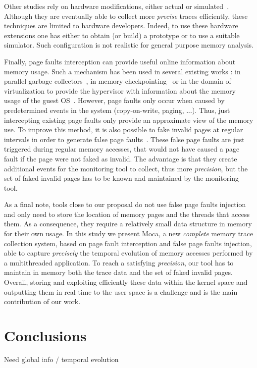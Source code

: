 Other studies rely on hardware modifications, either actual or
simulated~\cite{Bao08HMTT,Martonosi92MemSpy}.  Although they are eventually
able to collect more \emph{precise} traces efficiently, these techniques are limited
to hardware developers. Indeed, to use these hardware extensions one has
either to obtain (or build) a prototype or to use a suitable simulator. Such
configuration is not realistic for general purpose memory analysis.

Finally, page faults interception can provide useful online information about
memory usage. Such a mechanism has been used in several existing works : in
parallel garbage collectors~\cite{Boehm91Mostly}, in memory
checkpointing~\cite{Heo05Spaceefficient} or in the domain of virtualization to
provide the hypervisor with information about the memory usage of the guest
OS~\cite{Jones06Geiger}. However, page faults only occur when caused by
predetermined events in the system (copy-on-write, paging, ...). Thus, just intercepting existing page
faults only provide an approximate view of the memory use. To improve this method,
it is also possible to fake invalid
pages at regular intervals in order to generate false
page faults~\cite{Bae12Dynamic,Diener13CommunicationBased}.  These false page
faults are just triggered during regular memory accesses, that would not have
caused a page fault if the page were not faked as invalid. The advantage is
that they create additional events for the monitoring tool to collect, thus
more \emph{precision}, but the set of faked invalid pages has to be known and
maintained by the monitoring tool.

As a final note, tools close to our proposal do not use false page faults injection and only need to store the location of memory pages and the threads that access them.
As a consequence, they require a relatively small data structure in memory for their own usage.
In this study we present \gls{Moca}, a new \emph{complete} memory trace collection system, based on page
fault interception and false page faults injection, able to capture \emph{precisely} the temporal evolution of memory accesses performed by a multithreaded
application.
To reach a satisfying \emph{precision}, our tool has to maintain in memory both the trace data and
the set of faked invalid pages. Overall, storing and exploiting efficiently these data within the kernel space and outputting them in real time to the user space
is a challenge and is the main contribution of our work.

\section{Conclusions}
\label{sec:mem-cncl}

Need global info / temporal evolution
